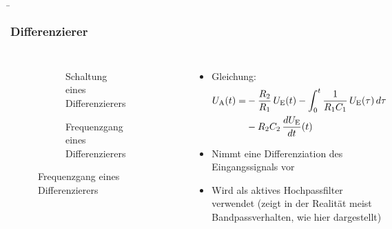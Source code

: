 \begin{frame}
    \b{
        \frametitle{Differenzierer}
        \begin{columns}
            \centering
            \begin{figure}
                \centering
                \begin{subfigure}{\linewidth}
                    \centering
                    \scalebox{1}{}
                    \caption{Schaltung eines Differenzierers}
                \end{subfigure}
                \begin{subfigure}{\linewidth}
                    \centering
                    \scalebox{0.7}{}
                    \caption{Frequenzgang eines Differenzierers}
                \end{subfigure}
            \end{figure}

            \raggedleft
            \begin{itemize}
                \item Gleichung:
                      \begin{align*}
                          U_{\textnormal{A}}(t) =
                          &- \frac{R_2}{R_1} \, U_{\textnormal{E}}(t)
                          - \int_0^t \frac{1}{R_1 C_1} \, U_{\textnormal{E}}(\tau) \, d\tau\\
                          &- R_2 C_2 \, \frac{dU_{\textnormal{E}}}{dt}(t)
                      \end{align*}
                \item Nimmt eine Differenziation des Eingangssignals vor
                \item Wird als aktives Hochpassfilter verwendet (zeigt in der Realität meist Bandpassverhalten, wie hier dargestellt)
            \end{itemize}
        \end{columns}
    }
\end{frame}


